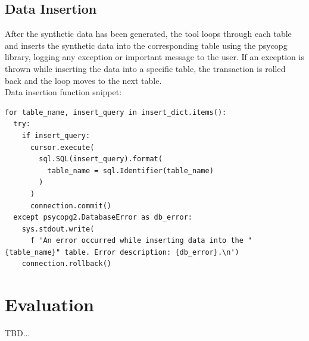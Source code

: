 \subsection{Data Insertion}
After the synthetic data has been generated, the tool loops through each table and inserts the synthetic data into the corresponding table using the psycopg library, logging any exception or important message to the user. If an exception is thrown while inserting the data into a specific table, the transaction is rolled back and the loop moves to the next table.\\
\newline
Data insertion function snippet:
\begin{verbatim}
for table_name, insert_query in insert_dict.items():
  try:
    if insert_query:
      cursor.execute(
        sql.SQL(insert_query).format(
          table_name = sql.Identifier(table_name)
        )
      ) 
      connection.commit()
  except psycopg2.DatabaseError as db_error:
    sys.stdout.write(
      f 'An error occurred while inserting data into the "{table_name}" table. Error description: {db_error}.\n')
    connection.rollback()
\end{verbatim}
\section{Evaluation}
TBD...